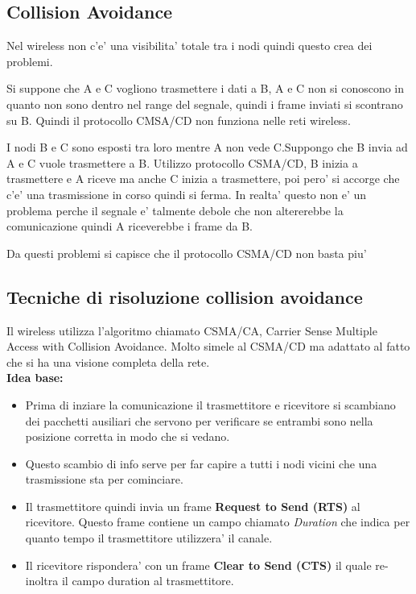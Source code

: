\subsection{Collision Avoidance}
Nel wireless non c'e' una visibilita' totale tra i nodi quindi questo crea dei problemi.
\begin{example}
  Si suppone che A e C vogliono trasmettere i dati a B, A e C non si conoscono in quanto non sono dentro nel range del segnale, quindi i frame inviati si scontrano su B. Quindi il protocollo CMSA/CD non funziona nelle reti wireless.
\end{example}
\begin{example}
  I nodi B e C sono esposti tra loro mentre A non vede C.Suppongo che B invia ad A e C vuole trasmettere a B. Utilizzo protocollo CSMA/CD, B inizia a trasmettere e A riceve ma anche C inizia a trasmettere, poi pero' si accorge che c'e' una trasmissione in corso quindi si ferma. In realta' questo non e' un problema perche il segnale e' talmente debole che non altererebbe la comunicazione quindi A riceverebbe i frame da B.
\end{example}
Da questi problemi si capisce che il protocollo CSMA/CD non basta piu'
\subsection{Tecniche di risoluzione collision avoidance}
Il wireless utilizza l'algoritmo chiamato CSMA/CA, Carrier Sense Multiple Access with Collision Avoidance. Molto simele al CSMA/CD ma adattato al fatto che si ha una visione completa della rete.\\
\textbf{Idea base:} \\
\begin{itemize}
  \item Prima di inziare la comunicazione il trasmettitore e ricevitore si scambiano dei pacchetti ausiliari che servono per verificare se entrambi sono nella posizione corretta in modo che si vedano.
  \item Questo scambio di info serve per far capire a tutti i nodi vicini che una trasmissione sta per cominciare.
  \item Il trasmettitore quindi invia un frame \textbf{Request to Send (RTS)} al ricevitore. Questo frame contiene un campo chiamato \textit{Duration} che indica per quanto tempo il trasmettitore utilizzera' il canale.
  \item Il ricevitore rispondera' con un frame \textbf{Clear to Send (CTS)} il quale re-inoltra il campo duration al trasmettitore.
\end{itemize}
